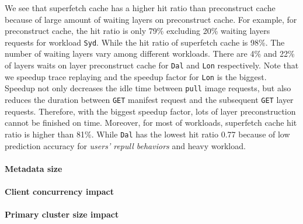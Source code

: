 We see that superfetch cache has a higher hit ratio than preconstruct cache
because of large amount of waiting layers on preconstruct cache.
For example, for preconstruct cache, 
the hit ratio is only 79\% excluding 20\% waiting layers requests for workload \texttt{Syd}.
While the hit ratio of superfetch cache is 98\%.
The number of waiting layers vary among different workloads.
There are 4\% and 22\% of 
layers waits on layer preconstruct cache for \texttt{Dal} and \texttt{Lon} respectively. 
Note that we speedup trace replaying
and the speedup factor for \texttt{Lon} is the biggest.
Speedup not only decreases the idle time between \texttt{pull} image requests,
but also reduces the duration between \texttt{GET} manifest request 
and the subsequent \texttt{GET} layer requests.
Therefore, with the biggest speedup factor,
lots of layer preconstruction cannot be finished on time.
Moreover,
for most of workloads,
superfetch cache hit ratio is higher than 81\%.
While \texttt{Dal} has the lowest hit ratio 0.77 
because of 
low prediction accuracy for \emph{users' repull behaviors} 
and heavy workload.

\paragraph{Metadata size} 

\paragraph{Client concurrency impact}

\paragraph{Primary cluster size  impact}





